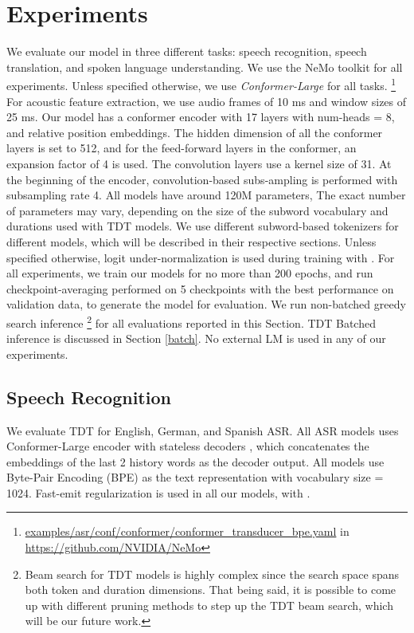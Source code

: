 \documentclass{article}
\begin{document}
\section{Experiments}\label{results}
We evaluate our model in three different tasks: speech recognition, speech translation, and spoken language understanding.
We use the NeMo \cite{kuchaiev2019nemo} toolkit for all experiments. Unless  specified otherwise, we use \emph{Conformer-Large} for all tasks. \footnote{\url{examples/asr/conf/conformer/conformer_transducer_bpe.yaml} in \url{https://github.com/NVIDIA/NeMo}} 
For acoustic feature extraction, we use audio frames of 10 ms and window sizes of 25 ms.
Our model has a conformer encoder with 17 layers with num-heads = 8, and relative position embeddings. The hidden dimension of all the conformer layers is set to 512, and for the feed-forward layers in the conformer, an expansion factor of 4 is used. The convolution layers use a kernel size of 31. At the beginning of the encoder,  convolution-based subs-ampling is performed  with subsampling rate 4.
All models have around 120M parameters, The exact number of parameters may vary, depending on the size of the subword vocabulary and durations used with TDT models.
We use different subword-based tokenizers  for different models, which will be described in their respective sections. 
Unless specified otherwise, logit under-normalization is used during training with .
For all experiments, we train our models for no more than 200 epochs, and run checkpoint-averaging performed on 5 checkpoints with the best performance on validation data, to generate the model for evaluation. We run non-batched greedy search inference \footnote{Beam search for TDT models is highly complex since the search space spans both token and duration dimensions. That being said, it is possible to come up with different pruning methods to step up the TDT beam search, which will be our future work.}  for all evaluations reported in this Section. TDT Batched inference is discussed in Section \ref{batch}. No external LM is used in any of our experiments.

\subsection{Speech Recognition}
We evaluate TDT for  English, German, and Spanish ASR. 
All ASR models uses Conformer-Large encoder with stateless decoders \cite{Ghodsi2020stateless}, which  concatenates the embeddings of the last 2 history words as
the decoder output. 
All models use Byte-Pair Encoding (BPE) \cite{sennrich2015neural} as the text representation with vocabulary size = 1024.  Fast-emit \cite{yu2021fastemit} regularization is used in all our models, with .
\end{document}
